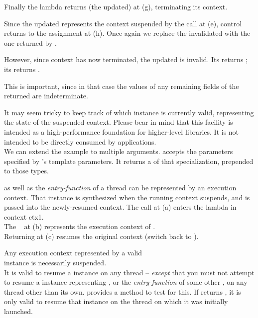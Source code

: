 Finally the lambda returns (the updated)  at (g), terminating its
context.

Since the updated  represents the context suspended by the call at
(e), control returns to the assignment at (h). Once again we replace the
invalidated  with the one returned by \op.

However, since context  has now terminated, the updated 
is invalid. Its \opbool returns ; its 
returns .

This is important, since in that case the values of any remaining fields of
the returned  are indeterminate.

It may seem tricky to keep track of which \ectx instance is currently
valid, representing the state of the suspended context. Please bear in
mind that this facility is intended as a high-performance foundation for
higher-level libraries. It is not intended to be directly consumed by
applications.\\
We can extend the example to multiple arguments.
\op accepts the parameters specified by \ectx's template parameters. It
returns a  of that \ectx specialization, prepended to those
types.


\label{subsec:main}
\main as well as the \emph{entry-function} of a thread can be represented by an
execution context. That \ectx instance is synthesized when the running context
suspends, and is passed into the newly-resumed context.
The  call at (a) enters the lambda in context ctx1.\\
The \ectx\  at (b) represents the execution context of \main.\\
Returning  at (c) resumes the original context (switch back to
\main).


Any execution context represented by a valid\\
\ectx instance is necessarily suspended.\\
It is valid to resume a \ectx instance on any thread -- \emph{except} that you
must not attempt to resume a \ectx instance representing \main, or
the \emph{entry-function} of some other , on any thread other
than its own.
\ectx provides a method to test for this.
If  returns , it is
only valid to resume that
\ectx instance on the thread on which it was initially launched.


